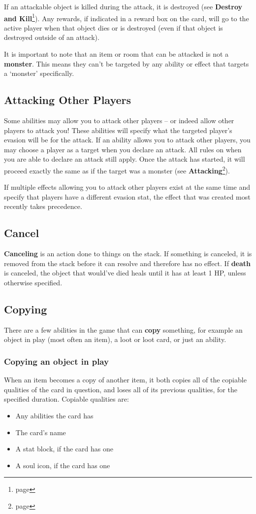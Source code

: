 \documentclass[10pt, a4paper, twoside]{article} %
\begin{document}
    If an attackable object is killed during the attack, it is destroyed (see \textbf{Destroy and Kill}\footnote{page \pageref{destroy}}). Any rewards, if indicated in a reward box on the card, will go to the active player when that object dies or is destroyed (even if that object is destroyed outside of an attack).

    It is important to note that an item or room that can be attacked is not a \textbf{monster}. This means they can’t be targeted by any ability or effect that targets a ‘monster’ specifically.
    \subsection{Attacking Other Players}
    Some abilities may allow you to attack other players – or indeed allow other players to attack you! These abilities will specify what the targeted player’s evasion will be for the attack. If an ability allows you to attack other players, you may choose a player as a target when you declare an attack. All rules on when you are able to declare an attack still apply. Once the attack has started, it will proceed exactly the same as if the target was a monster (see \textbf{Attacking}\footnote{page \pageref{attacking}}).

    If multiple effects allowing you to attack other players exist at the same time and specify that players have a different evasion stat, the effect that was created most recently takes precedence.
    \subsection{Cancel}
    \textbf{Canceling} is an action done to things on the stack. If something is canceled, it is removed from the stack before it can resolve and therefore has no effect. If \textbf{death} is canceled, the object that would’ve died heals until it has at least 1 HP, unless otherwise specified.
    \subsection{Copying}
    \label{copying}
    There are a few abilities in the game that can \textbf{copy} something, for example an object in play (most often an item), a loot or loot card, or just an ability.
    \subsubsection*{Copying an object in play}
    When an item becomes a copy of another item, it both copies all of the copiable qualities of the card in question, and loses all of its previous qualities, for the specified duration. Copiable qualities are:
    \begin{itemize}
        \item Any abilities the card has
        \item The card’s name
        \item A stat block, if the card has one
        \item A soul icon, if the card has one
    \end{itemize}
\end{document}
